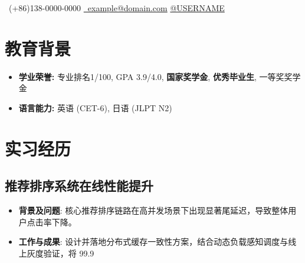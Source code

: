\documentclass{resume}
\begin{document}


\begin{center}
\faPhoneSquare \ (+86)138-0000-0000 \quad 
\href{mailto:example@domain.com}{\faEnvelopeO \ example@domain.com} \quad 
\href{https://github.com/USERNAME}{\faGithub @USERNAME}
\end{center}

\section{\faGraduationCap \kaishu 教育背景}
\begin{itemize}
    \item \textbf{学业荣誉:} 专业排名1/100, GPA 3.9/4.0, \textbf{国家奖学金}, \textbf{优秀毕业生}, 一等奖奖学金
    \item \textbf{语言能力:} 英语 (CET-6), 日语 (JLPT N2)
\end{itemize}


\section{\faBriefcase \kaishu 实习经历}
\subsection{推荐排序系统在线性能提升}
\begin{itemize}
  \item \textbf{背景及问题}: 核心推荐排序链路在高并发场景下出现显著尾延迟，导致整体用户点击率下降。
  \item \textbf{工作与成果}: 设计并落地分布式缓存一致性方案，结合动态负载感知调度与线上灰度验证，将 99.9%
\end{itemize}
\end{document}
